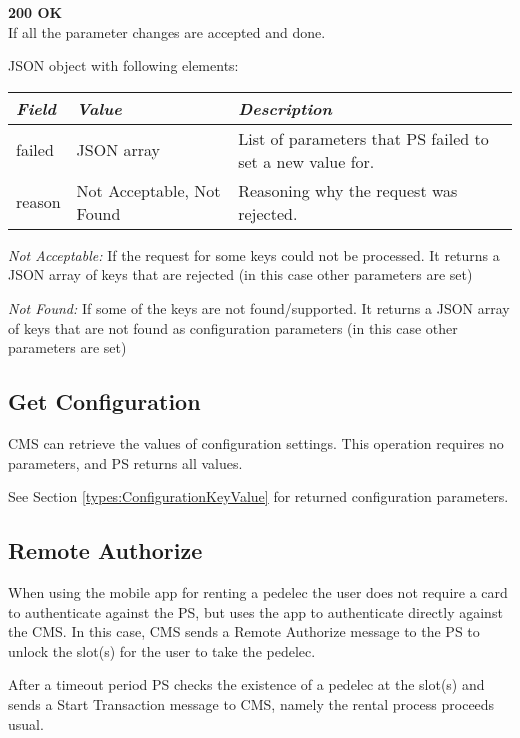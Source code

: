 \textbf{200 OK}\\ If all the parameter changes are accepted and done.

JSON object with following elements:\\
\begin{tabularx}{\linewidth}{ | l | l | X | }
  \hline
  \textit{Field} & \textit{Value} & \textit{Description} \\
  \hline \hline
  failed			& JSON array & List of parameters that \acs{PS} failed to set a new value for.\\
  reason 		& Not Acceptable, Not Found & Reasoning why the request was rejected.\\
  \hline
\end{tabularx}

\textit{Not Acceptable:} If the request for some keys could not be processed. It returns a JSON array of keys that are rejected (in this case other parameters are set)

\textit{Not Found:} If some of the keys are not found/supported. It returns a JSON array of keys that are not found as configuration parameters (in this case other parameters are set)

\subsection{Get Configuration}

\acs{CMS} can retrieve the values of configuration settings. This operation requires no parameters, and \acs{PS} returns all values.

 See Section \ref{types:ConfigurationKeyValue} for returned configuration parameters.

\subsection{Remote Authorize}

When using the mobile app for renting a pedelec the user does not require a card to authenticate against the \acs{PS}, but uses the app to authenticate directly against the \acs{CMS}. In this case, \acs{CMS} sends a Remote Authorize message to the \acs{PS} to unlock the slot(s) for the user to take the pedelec. 

After a timeout period \acs{PS} checks the existence of a pedelec at the slot(s) and sends a Start Transaction message to \acs{CMS}, namely the rental process proceeds usual.

